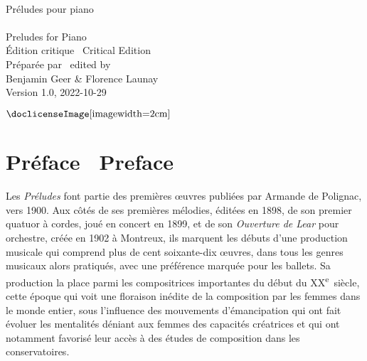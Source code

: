 \documentclass[a4paper, 12pt]{book}
\newcommand{\bigdot}[0]{{\Large \textbullet}}
\begin{document}
\frontmatter


\begin{titlepage}
\begin{center}
   \\
  \vspace{3.25 cm}
  {\fontsize{30}{40}\selectfont Préludes pour piano} \\
  \vspace{0.5 cm}
  {\fontsize{30}{40}\selectfont \textbullet} \\
  \vspace{0.35 cm}
  {\fontsize{30}{40}\selectfont Preludes for Piano} \\
  \vspace{3.25 cm}
  {\Large Édition critique \textbullet\ Critical Edition} \\
  \vspace{3.25 cm}
  {\Large Préparée par \textbullet\ \foreignlanguage{english}{edited by}} \\
  \vspace{0.25 cm}
  {\Large Benjamin Geer \& Florence Launay} \\
  \vspace{3.25 cm}
  {\footnotesize Version 1.0, 2022-10-29} \\
  \vspace{0.25 cm}
  \begin{minipage}{\textwidth}
  \centering
  $\vcenter{\hbox{\doclicenseImage[imagewidth=2cm]}}$
  \end{minipage}
  \end{center}
\end{titlepage}


\chapter*{Préface \bigdot\ \foreignlanguage{english}{Preface}}

Les \emph{Préludes} font partie des premières œuvres publiées par
Armande de Polignac, vers 1900. Aux côtés de ses premières mélodies,
éditées en 1898, de son premier quatuor à cordes, joué en concert en
1899, et de son \emph{Ouverture de Lear} pour orchestre, créée en 1902 à
Montreux, ils marquent les débuts d'une production musicale qui comprend
plus de cent soixante-dix œuvres, dans tous les genres musicaux alors
pratiqués, avec une préférence marquée pour les ballets. Sa production
la place parmi les compositrices importantes du début du
XX\textsuperscript{e}~siècle, cette époque qui voit une floraison
inédite de la composition par les femmes dans le monde entier, sous
l'influence des mouvements d'émancipation qui ont fait évoluer les
mentalités déniant aux femmes des capacités créatrices et qui ont
notamment favorisé leur accès à des études de composition dans les
conservatoires.
\end{document}
